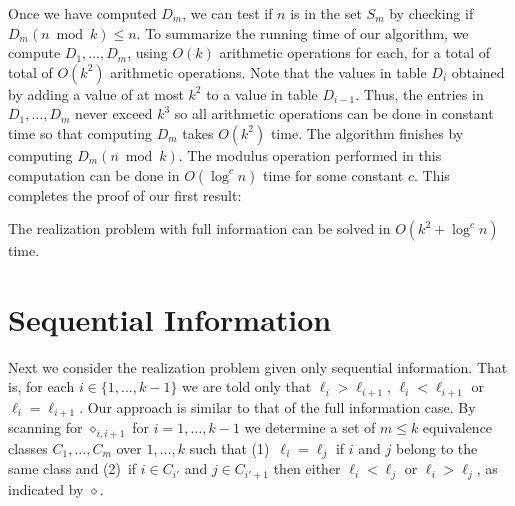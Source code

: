 \documentclass{elsart}
\newcommand{\op}{\diamond}
\begin{document}
Once we have computed $D_{m}$, we can test if $n$ is in the set $S_m$
by checking if $D_m(n\bmod k) \le n$.  To summarize the running time
of our algorithm, we compute $D_1,\ldots,D_m$, using $O(k)$ arithmetic
operations for each, for a total of  total of $O(k^2)$ arithmetic
operations.  Note that the values in table $D_i$ obtained by adding a
value of at most $k^2$ to a value in table $D_{i-1}$.  Thus, the
entries in $D_1,\ldots,D_m$ never exceed $k^{3}$ so all arithmetic
operations can be done in constant time so that computing $D_m$ takes
$O(k^2)$ time.  The algorithm finishes by computing $D_m(n\bmod k)$.
The modulus operation performed in this computation can be done in
$O(\log^c n)$ time for some constant $c$. This completes the proof of
our first result:

\begin{thm}
The realization problem with full information can be solved in
$O(k^2+\log^c n)$ time.
\end{thm}



\section{Sequential Information}

Next we consider the realization problem given only sequential
information.  That is, for each $i\in\{1,\ldots,k-1\}$ we are told
only that $\ell_i > \ell_{i+1}$, $\ell_i < \ell_{i+1}$ or
$\ell_i=\ell_{i+1}$.  Our approach is similar to that of the full
information case.  By scanning for $\op_{i,i+1}$ for $i=1,\ldots,k-1$
we determine a set of $m\le k$ equivalence classes $C_1,\ldots,C_m$
over $1,\ldots,k$ such that (1)~$\ell_i=\ell_j$ if $i$ and $j$ belong to the
same class and (2)~if $i\in C_{i'}$ and $j\in C_{i'+1}$ then either
$\ell_i<\ell_j$ or $\ell_i > \ell_j$, as indicated by $\op$. 
\end{document}

